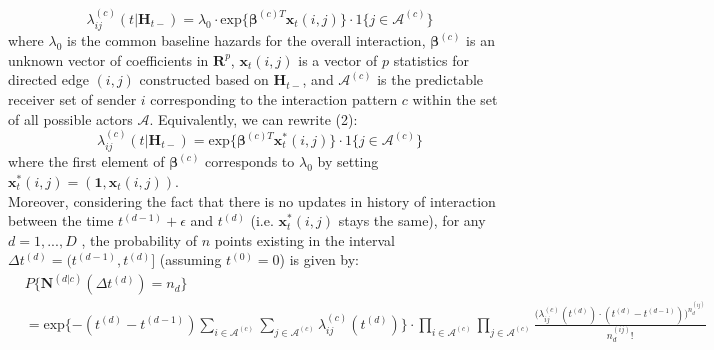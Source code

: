 \documentclass[a4paper]{article}
\begin{document}
\begin{equation}
\lambda^{(c)}_{ij}(t|\boldsymbol{H}_{t-})=\lambda_0\cdot \mbox{exp}\Big\{\boldsymbol{\beta}^{(c)T}\boldsymbol{x}_t(i, j)\Big\}\cdot 1\{j \in \mathcal{A}^{(c)}\}
\end{equation}
where $\lambda_0$ is the common baseline hazards for the overall interaction, $\boldsymbol{\beta}^{(c)}$ is an unknown vector of coefficients in $\boldsymbol{R}^{p}$, $\boldsymbol{x}_t(i, j)$ is a vector of $p$ statistics for directed edge $(i, j)$ constructed based on
$\boldsymbol{H}_{t-}$, and $\mathcal{A}^{(c)}$ is the predictable receiver set of sender $i$ corresponding to the interaction pattern $c$ within the set of all possible actors $\mathcal{A}$. Equivalently, we can rewrite (2): 
\begin{equation}
\lambda^{(c)}_{ij}(t|\boldsymbol{H}_{t-})= \mbox{exp}\Big\{\boldsymbol{\beta}^{(c)T}\boldsymbol{x}^*_t(i, j)\Big\}\cdot 1\{j \in \mathcal{A}^{(c)}\}
\end{equation}
where the first element of $\boldsymbol{\beta}^{(c)}$ corresponds to $\lambda_0$ by setting $\boldsymbol{x}^*_t(i, j)=(\boldsymbol{1}, \boldsymbol{x}_t(i, j))$.\\ \newline
Moreover, considering the fact that there is no updates in history of interaction between the time $t^{(d-1)}+\epsilon$ and $t^{(d)}$ (i.e. $\boldsymbol{x}^*_t(i, j)$ stays the same), for any $d=1,...,D$ , the probability of $n$ points existing in the interval $\Delta t^{(d)}=(t^{(d-1)}, t^{(d)}]$ (assuming $t^{(0)}=0$) is given by: 
\begin{equation}
\begin{aligned}
&P\Big\{\mathbf{N}^{(d|c)}(\Delta t^{(d)})=n_d\Big\}\\&=\mbox{exp}\Big\{{-(t^{(d)}-t^{(d-1)})\sum\limits_{i \in \mathcal{A}^{(c)}}\sum\limits_{j\in \mathcal{A}^{(c)}}\lambda_{ij}^{(c)}(t^{(d)})}\Big\}\cdot \prod_{i \in \mathcal{A}^{(c)}}\prod_{j\in \mathcal{A}^{(c)}}\frac{\Big(\lambda_{ij}^{(c)}(t^{(d)})\cdot(t^{(d)}-t^{(d-1)})\Big)^{n_d^{(ij)}}}{n_d^{(ij)}!}
\end{aligned}
\end{equation}
\end{document}
